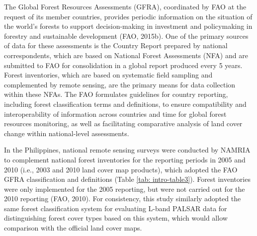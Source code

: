 The Global Forest Resources Assessments (GFRA), coordinated by FAO at the request of its member countries, provides periodic information on the situation of the world's forests to support decision-making in investment and policymaking in forestry and sustainable development (FAO, 2015b). One of the primary sources of data for these assessments is the Country Report prepared by national correspondents, which are based on National Forest Assessments (NFA) and are submitted to FAO for consolidation in a global report produced every 5 years. Forest inventories, which are based on systematic field sampling and complemented by remote sensing, are the primary means for data collection within these NFAs. The FAO formulates guidelines for country reporting, including forest classification terms and definitions, to ensure compatibility and interoperability of information across countries and time for global forest resources monitoring, as well as facilitating comparative analysis of land cover change within national-level assessments.

In the Philippines, national remote sensing surveys were conducted by NAMRIA to complement national forest inventories for the reporting periods in 2005 and 2010 (i.e., 2003 and 2010 land cover map products), which adopted the FAO GFRA classification and definitions (Table \ref{tab: intro-table3}). Forest inventories were only implemented for the 2005 reporting, but were not carried out for the 2010 reporting (FAO, 2010). For consistency, this study similarly adopted the same forest classification system for evaluating L-band PALSAR data for distinguishing forest cover types based on this system, which would allow comparison with the official land cover maps.


